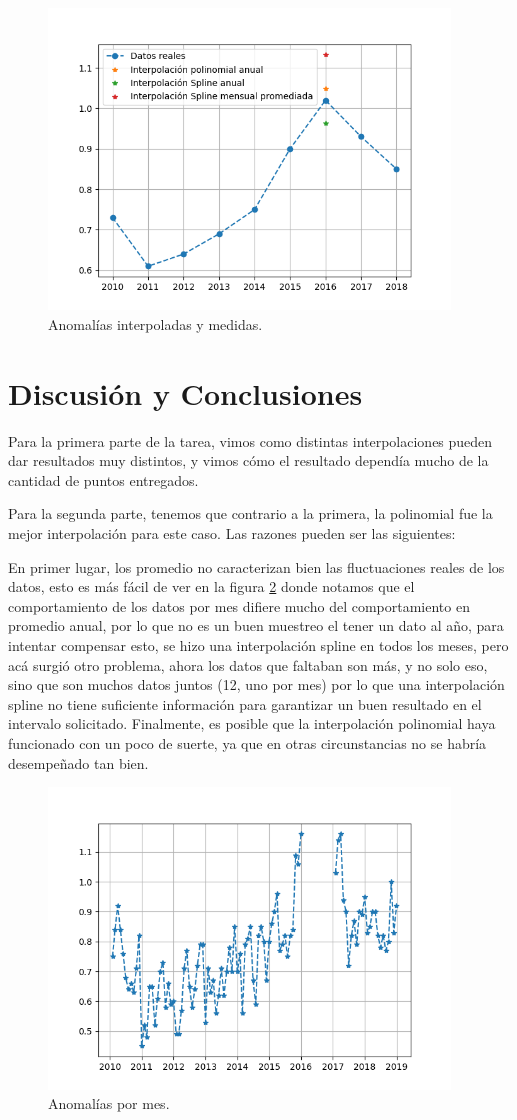\documentclass[letter, 11pt]{article}
\begin{document}
\begin{figure}[H]
  \centering
  \includegraphics[height=8cm]{P2_1.png}
  \caption{Anomalías interpoladas y medidas.}
  \label{P2_1}
\end{figure}






\newpage

\section{Discusión y Conclusiones}

Para la primera parte de la tarea, vimos como distintas interpolaciones pueden dar resultados muy distintos, y vimos cómo el resultado dependía mucho de la cantidad de puntos entregados.

Para la segunda parte, tenemos que contrario a la primera, la polinomial fue la mejor interpolación para este caso. Las razones pueden ser las siguientes:

En primer lugar, los promedio no caracterizan bien las fluctuaciones reales de los datos, esto es más fácil de ver en la figura \ref{P2_2} donde notamos que el comportamiento de los datos por mes difiere mucho del comportamiento en promedio anual, por lo que no es un buen muestreo el tener un dato al año, para intentar compensar esto, se hizo una interpolación spline en todos los meses, pero acá surgió otro problema, ahora los datos que faltaban son más, y no solo eso, sino que son muchos datos juntos (12, uno por mes) por lo que una interpolación spline no tiene suficiente información para garantizar un buen resultado en el intervalo solicitado. Finalmente, es posible que la interpolación polinomial haya funcionado con un poco de suerte, ya que en otras circunstancias no se habría desempeñado tan bien.


\begin{figure}[H]
  \centering
  \includegraphics[height=8cm]{P2_2.png}
  \caption{Anomalías por mes.}
  \label{P2_2}
\end{figure}
\end{document}
